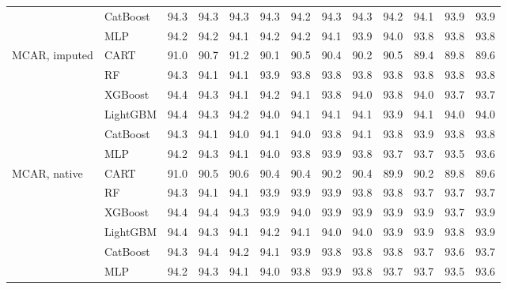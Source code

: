 \documentclass[pdflatex,sn-mathphys]{sn-jnl}
\theoremstyle{thmstyleone}
\begin{document}
\begin{table}[htbp]
\begin{tabular}{@{}llrrrrrrrrrrr@{}}
 & CatBoost & 94.3 & 94.3 & 94.3 & 94.3 & 94.2 & 94.3 & 94.3 & 94.2 & 94.1 & 93.9 & 93.9 \\
 & MLP & 94.2 & 94.2 & 94.1 & 94.2 & 94.2 & 94.1 & 93.9 & 94.0 & 93.8 & 93.8 & 93.8 \\
\midrule
MCAR, imputed & CART & 91.0 & 90.7 & 91.2 & 90.1 & 90.5 & 90.4 & 90.2 & 90.5 & 89.4 & 89.8 & 89.6 \\
 & RF & 94.3 & 94.1 & 94.1 & 93.9 & 93.8 & 93.8 & 93.8 & 93.8 & 93.8 & 93.8 & 93.8 \\
 & XGBoost & 94.4 & 94.3 & 94.1 & 94.2 & 94.1 & 93.8 & 94.0 & 93.8 & 94.0 & 93.7 & 93.7 \\
 & LightGBM & 94.4 & 94.3 & 94.2 & 94.0 & 94.1 & 94.1 & 94.1 & 93.9 & 94.1 & 94.0 & 94.0 \\
 & CatBoost & 94.3 & 94.1 & 94.0 & 94.1 & 94.0 & 93.8 & 94.1 & 93.8 & 93.9 & 93.8 & 93.8 \\
 & MLP & 94.2 & 94.3 & 94.1 & 94.0 & 93.8 & 93.9 & 93.8 & 93.7 & 93.7 & 93.5 & 93.6 \\
\midrule
MCAR, native & CART & 91.0 & 90.5 & 90.6 & 90.4 & 90.4 & 90.2 & 90.4 & 89.9 & 90.2 & 89.8 & 89.6 \\
 & RF & 94.3 & 94.1 & 94.1 & 93.9 & 93.9 & 93.9 & 93.8 & 93.8 & 93.7 & 93.7 & 93.7 \\
 & XGBoost & 94.4 & 94.4 & 94.3 & 93.9 & 94.0 & 93.9 & 93.9 & 93.9 & 93.9 & 93.7 & 93.9 \\
 & LightGBM & 94.4 & 94.3 & 94.1 & 94.2 & 94.1 & 94.0 & 94.0 & 93.9 & 93.9 & 93.8 & 93.9 \\
 & CatBoost & 94.3 & 94.4 & 94.2 & 94.1 & 93.9 & 93.8 & 93.8 & 93.8 & 93.7 & 93.6 & 93.7 \\
 & MLP & 94.2 & 94.3 & 94.1 & 94.0 & 93.8 & 93.9 & 93.8 & 93.7 & 93.7 & 93.5 & 93.6 \\
\bottomrule
\end{tabular}
\end{table}
\end{document}
